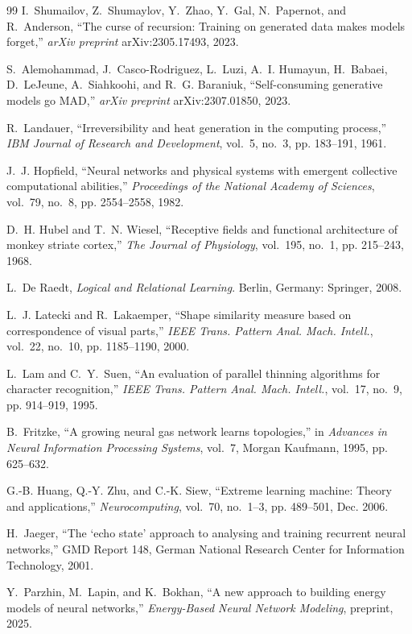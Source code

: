 \documentclass[12pt, a4paper]{article}
\begin{document}
\begin{thebibliography}{99}
I.~Shumailov, Z.~Shumaylov, Y.~Zhao, Y.~Gal, N.~Papernot, and R.~Anderson, ``The curse of recursion: Training on generated data makes models forget,'' \emph{arXiv preprint} arXiv:2305.17493, 2023.

S.~Alemohammad, J.~Casco-Rodriguez, L.~Luzi, A.~I. Humayun, H.~Babaei, D.~LeJeune, A.~Siahkoohi, and R.~G. Baraniuk, ``Self-consuming generative models go MAD,'' \emph{arXiv preprint} arXiv:2307.01850, 2023.

R.~Landauer, ``Irreversibility and heat generation in the computing process,'' \emph{IBM Journal of Research and Development}, vol.~5, no.~3, pp. 183--191, 1961.

J.~J. Hopfield, ``Neural networks and physical systems with emergent collective computational abilities,'' \emph{Proceedings of the National Academy of Sciences}, vol.~79, no.~8, pp. 2554--2558, 1982.

D.~H. Hubel and T.~N. Wiesel, ``Receptive fields and functional architecture of monkey striate cortex,'' \emph{The Journal of Physiology}, vol.~195, no.~1, pp. 215--243, 1968.

L.~De Raedt, \emph{Logical and Relational Learning}. Berlin, Germany: Springer, 2008.

L.~J. Latecki and R.~Lakaemper, ``Shape similarity measure based on correspondence of visual parts,'' \emph{IEEE Trans. Pattern Anal. Mach. Intell.}, vol.~22, no.~10, pp. 1185--1190, 2000.

L.~Lam and C.~Y.~Suen, ``An evaluation of parallel thinning algorithms for character recognition,'' \emph{IEEE Trans. Pattern Anal. Mach. Intell.}, vol.~17, no.~9, pp. 914--919, 1995.

B.~Fritzke, ``A growing neural gas network learns topologies,'' in \emph{Advances in Neural Information Processing Systems}, vol.~7, Morgan Kaufmann, 1995, pp. 625--632.

G.-B. Huang, Q.-Y. Zhu, and C.-K. Siew, ``Extreme learning machine: Theory and applications,'' \emph{Neurocomputing}, vol.~70, no.~1--3, pp. 489--501, Dec. 2006.

H.~Jaeger, ``The `echo state' approach to analysing and training recurrent neural networks,'' GMD Report 148, German National Research Center for Information Technology, 2001.

Y.~Parzhin, M.~Lapin, and K.~Bokhan, ``A new approach to building energy models of neural networks,'' \emph{Energy-Based Neural Network Modeling}, preprint, 2025.

\end{thebibliography}
\end{document}
